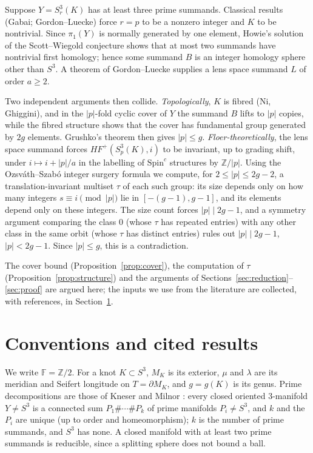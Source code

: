 \documentclass[11pt]{article}
\theoremstyle{definition}
\newcommand{\F}{\mathbb{F}}
\newcommand{\Z}{\mathbb{Z}}
\newcommand{\HFp}{\mathit{HF}^+}
\newcommand{\Spinc}{\mathrm{Spin}^c}
\begin{document}
Suppose $Y=S^3_r(K)$ has at least three prime summands. Classical results (Gabai; Gordon--Luecke) force $r=p$ to be a nonzero integer and $K$ to be nontrivial. Since $\pi_1(Y)$ is normally generated by one element, Howie's solution of the Scott--Wiegold conjecture shows that at most two summands have nontrivial first homology; hence some summand $B$ is an integer homology sphere other than $S^3$. A theorem of Gordon--Luecke supplies a lens space summand $L$ of order $a\ge 2$.

Two independent arguments then collide. \emph{Topologically}, $K$ is fibred (Ni, Ghiggini), and in the $|p|$-fold cyclic cover of $Y$ the summand $B$ lifts to $|p|$ copies, while the fibred structure shows that the cover has fundamental group generated by $2g$ elements. Grushko's theorem then gives $|p|\le g$. \emph{Floer-theoretically}, the lens space summand forces $\HFp(S^3_p(K),i)$ to be invariant, up to grading shift, under $i\mapsto i+|p|/a$ in the labelling of $\Spinc$ structures by $\Z/|p|$. Using the Ozsv\'ath--Szab\'o integer surgery formula we compute, for $2\le |p|\le 2g-2$, a translation-invariant multiset $\tau$ of each such group: its size depends only on how many integers $s\equiv i \pmod{|p|}$ lie in $[-(g-1),g-1]$, and its elements depend only on these integers. The size count forces $|p|\mid 2g-1$, and a symmetry argument comparing the class $0$ (whose $\tau$ has repeated entries) with any other class in the same orbit (whose $\tau$ has distinct entries) rules out $|p|\mid 2g-1$, $|p|<2g-1$. Since $|p|\le g$, this is a contradiction.

The cover bound (Proposition~\ref{prop:cover}), the computation of $\tau$ (Proposition~\ref{prop:structure}) and the arguments of Sections~\ref{sec:reduction}--\ref{sec:proof} are argued here; the inputs we use from the literature are collected, with references, in Section~\ref{sec:cited}.

\section{Conventions and cited results}\label{sec:cited}

We write $\F=\Z/2$. For a knot $K\subset S^3$, $M_K$ is its exterior, $\mu$ and $\lambda$ are its meridian and Seifert longitude on $T=\partial M_K$, and $g=g(K)$ is its genus. Prime decompositions are those of Kneser and Milnor \cite{Kneser,Milnor}: every closed oriented $3$-manifold $Y\ne S^3$ is a connected sum $P_1\#\cdots\# P_k$ of prime manifolds $P_i\ne S^3$, and $k$ and the $P_i$ are unique (up to order and homeomorphism); $k$ is the number of prime summands, and $S^3$ has none. A closed manifold with at least two prime summands is reducible, since a splitting sphere does not bound a ball.
\end{document}
